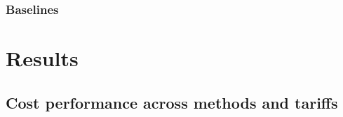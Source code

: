 \documentclass[preprint,12pt, 3p]{elsarticle}
\begin{document}

\subsubsection{Baselines}
\label{subsubsec:protocol_baselines}






\section{Results}
\label{sec:results}


\subsection{Cost performance across methods and tariffs}
\label{subsec:res_method_tariff}
\end{document}
